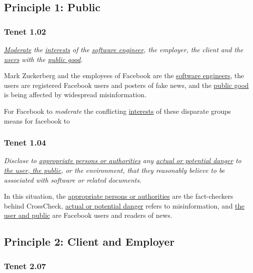 
\subsection{Principle 1: Public}

\subsubsection{Tenet 1.02}

\emph{\ul{Moderate} the \ul{interests} of the \ul{software engineer}, the employer, the client and the \ul{users} with the \ul{public good}. \cite{se_code}}

Mark Zuckerberg and the employees of Facebook are the \ul{software engineers}, the users are registered Facebook users and posters of fake news, and the \ul{public good} is being affected by widespread misinformation.

For Facebook to \emph{moderate} the conflicting \ul{interests} of these disparate groups means for facebook to 

\subsubsection{Tenet 1.04}

\emph{Disclose to \ul{appropriate persons or authorities} any \ul{actual or potential danger} to \ul{the user, the public}, or the environment, that they reasonably believe to be associated with software or related documents. \cite{se_code}}

In this situation, the \ul{appropriate persons or authorities} are the fact-checkers behind CrossCheck, \ul{actual or potential danger} refers to misinformation, and \ul{the user and public} are Facebook users and readers of news.


\subsection{Principle 2: Client and Employer}

\subsubsection{Tenet 2.07}

